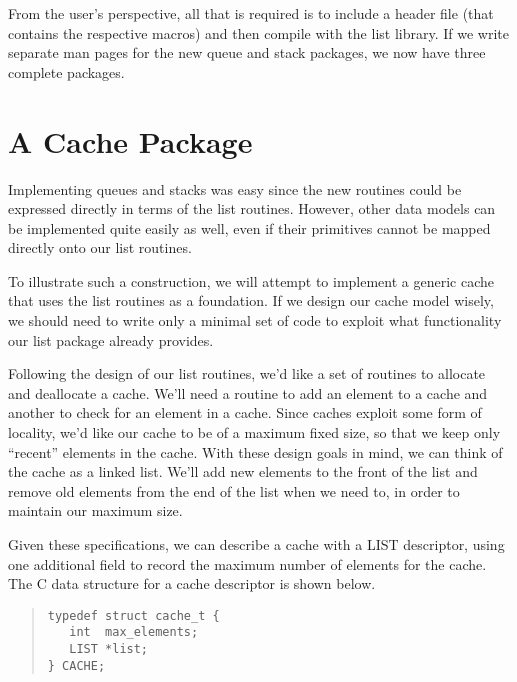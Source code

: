 From the user's perspective, all that is required is to include a header file
(that contains the respective macros) and then compile with the list library.
If we write separate man pages for the new queue and stack packages, we
now have three complete packages.


\section{A Cache Package}
Implementing queues and stacks was easy since the new routines could be
expressed directly in terms of the list routines.  However, other data models
can be implemented quite easily as well, even if their primitives cannot be
mapped directly onto our list routines.

To illustrate such a construction, we will attempt to implement a generic
cache that uses the list routines as a foundation.  If we design our cache
model wisely, we should need to write only a minimal set of code to exploit
what functionality our list package already provides.

Following the design of our list routines, we'd like a set of routines to
allocate and deallocate a cache.  We'll need a routine to add an element to a
cache and another to check for an element in a cache.  Since caches exploit
some form of locality, we'd like our cache to be of a maximum fixed size, so
that we keep only ``recent'' elements in the cache.  With these design goals
in mind, we can think of the cache as a linked list.  We'll add new elements
to the front of the list and remove old elements from the end of the list when
we need to, in order to maintain our maximum size.

Given these specifications, we can describe a cache with a LIST descriptor,
using one additional field to record the maximum number of
elements for the cache.  The C data structure for a cache descriptor is
shown below.
\begin{quote}
\begin{verbatim}       
typedef struct cache_t {
   int  max_elements;
   LIST *list;
} CACHE;
\end{verbatim}
\end{quote}

